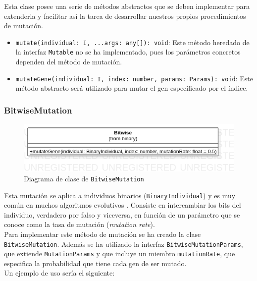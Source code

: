 Esta clase posee una serie de métodos abstractos que se deben implementar para extenderla y facilitar así la tarea de desarrollar nuestros propios procedimientos de mutación.

\begin{itemize}
    \item \texttt{mutate(individual: I, ...args: any[]): void}: Este método heredado de la interfaz \texttt{Mutable} no se ha implementado, pues los parámetros concretos dependen del método de mutación.
    \item \texttt{mutateGene(individual: I, index: number, params: Params): void}: Este método abstracto será utilizado para mutar el gen especificado por el índice.
\end{itemize}

\subsubsection{BitwiseMutation}

\begin{figure}[ht]
    \centering
    \includegraphics[scale=0.4]{mem/images/cap-4/4.2.7(Mutation)/Bitwise.png}
    \caption{Diagrama de clase de \texttt{BitwiseMutation}}
    \label{fig:my_label}
\end{figure}

Esta mutación se aplica a individuos binarios (\texttt{BinaryIndividual}) y es muy común en muchos algoritmos evolutivos \cite{holland1992adaptation}. Consiste en intercambiar los bits del individuo, verdadero por falso y viceversa, en función de un parámetro que se conoce como la tasa de mutación (\textit{mutation rate}). \\

Para implementar este método de mutación se ha creado la clase \texttt{BitwiseMutation}. Además se ha utilizado la interfaz \texttt{BitwiseMutationParams}, que extiende \texttt{MutationParams} y que incluye un miembro \texttt{mutationRate}, que especifica la probabilidad que tiene cada gen de ser mutado. \\

Un ejemplo de uso sería el siguiente: \\

